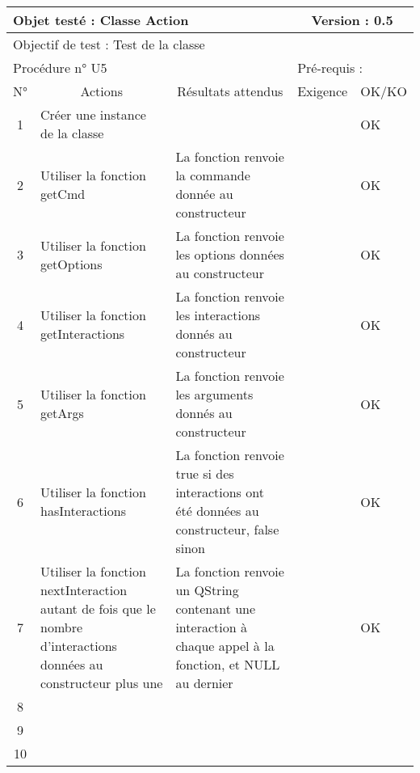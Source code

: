 \documentclass{../res/univ-projet}
\begin{document}
\begin{center}
	
    \begin{tabular}{|c|p{5cm}|p{5cm}|p{1.5cm}|p{1.5cm}|}
      \hline
      \multicolumn{3}{|l|}{Objet testé : Classe Action} & \multicolumn{2}{c|}{Version : 0.5}\\ \hline
      \multicolumn{5}{|l|}{Objectif de test : Test de la classe}\\ \hline
      \multicolumn{3}{|l|}{Procédure n° U5} & \multicolumn{2}{p{3cm}|}{Pré-requis : }\\ \hline
      \multicolumn{1}{|c|}{N°} & \multicolumn{1}{c|}{Actions} & \multicolumn{1}{c|}{Résultats attendus} & 
      \multicolumn{1}{c|}{Exigence} & \multicolumn{1}{c|}{OK/KO}\\ \hline
      1 & Créer une instance de la classe &  &  & OK \\
      2 & Utiliser la fonction getCmd & La fonction renvoie la commande donnée au constructeur &  & OK \\
      3 & Utiliser la fonction getOptions & La fonction renvoie les options données au constructeur &  & OK \\
      4 & Utiliser la fonction getInteractions & La fonction renvoie les interactions donnés au constructeur &  & OK \\
      5 & Utiliser la fonction getArgs & La fonction renvoie les arguments donnés au constructeur &  & OK \\
	    6 & Utiliser la fonction hasInteractions & La fonction renvoie true si des interactions ont été données au constructeur, false sinon &  & OK \\
      7 & Utiliser la fonction nextInteraction autant de fois que le nombre d'interactions données au constructeur plus une & La fonction renvoie un QString contenant une interaction à chaque appel à la fonction, et NULL au dernier &  & OK \\
      8 &  &  &  & \\
      9 &  &  &  & \\
      10 &  &  &  &\\ 
	\hline
    \end{tabular}
    \vskip 2.2cm
	

\end{center}
\end{document}
